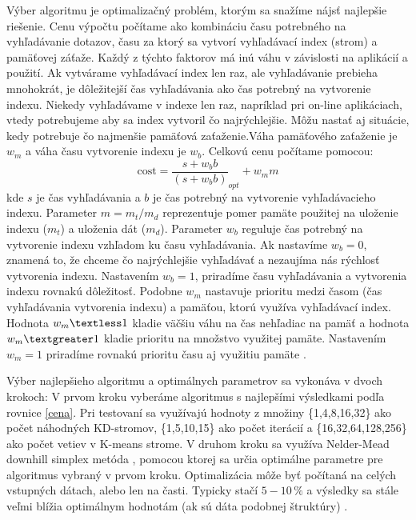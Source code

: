 \documentclass[12pt,a4paper,oneside]{fithesis2}
\begin{document}
	Výber algoritmu je optimalizačný problém, ktorým sa snažíme nájsť najlepšie riešenie. Cenu výpočtu počítame ako kombináciu času potrebného na vyhľadávanie dotazov, času za ktorý sa vytvorí vyhľadávací index (strom) a pamäťovej záťaže. Každý z týchto faktorov má inú váhu v závislosti na aplikácií a použití. Ak vytvárame vyhľadávací index len raz, ale vyhľadávanie prebieha mnohokrát, je dôležitejší čas vyhľadávania ako čas potrebný na vytvorenie indexu. Niekedy vyhľadávame v indexe len raz, napríklad pri on-line aplikáciach, vtedy potrebujeme aby sa index vytvoril čo najrýchlejšie. Môžu nastať aj situácie, kedy potrebuje čo najmenšie pamäťová zaťaženie.Váha pamäťového zaťaženie je $w_m$ a váha času vytvorenie indexu je $w_b$. Celkovú cenu počítame pomocou:
	\begin{equation}
	\mathrm{cost} = \dfrac{s + w_bb}{(s + w_bb)}_{opt} + w_mm
	\label{cena}
	\end{equation}
kde $s$ je čas vyhľadávania a $b$ je čas potrebný na vytvorenie vyhľadávacieho indexu. Parameter $m = m_t/m_d$ reprezentuje pomer pamäte použitej na uloženie indexu ($m_t$) a uloženia dát ($m_d$). Parameter $w_b$ reguluje čas potrebný na vytvorenie indexu vzhľadom ku času vyhľadávania. Ak nastavíme $w_b = 0$, znamená to, že chceme čo najrýchlejšie vyhľadávať a nezaujíma nás rýchlosť vytvorenia indexu. Nastavením $w_b = 1$, priradíme času vyhľadávania a vytvorenia indexu rovnakú dôležitosť. Podobne $w_m$ nastavuje prioritu medzi časom (čas vyhľadávania vytvorenia indexu) a pamäťou, ktorú využíva vyhľadávací index. Hodnota $w_m \textless 1$ kladie väčšiu váhu na čas nehľadiac na pamäť a hodnota $w_m \textgreater 1$  kladie prioritu na množstvo využitej pamäte. Nastavením $w_m = 1$ priradíme rovnakú prioritu času aj využitiu pamäte \cite{muja_flann_2009}. 

Výber najlepšieho algoritmu a optimálnych parametrov sa vykonáva v dvoch krokoch: V prvom kroku vyberáme algoritmus s najlepšími výsledkami podľa rovnice \ref{cena}. Pri testovaní sa využívajú hodnoty z množiny \{1,4,8,16,32\} ako počet náhodných KD-stromov, \{1,5,10,15\} ako počet iterácií a \{16,32,64,128,256\} ako počet vetiev v K-means strome. V druhom kroku sa využíva Nelder-Mead downhill simplex metóda \cite{NelderMead65}, pomocou ktorej sa určia optimálne parametre pre algoritmus vybraný v prvom kroku. Optimalizácia môže byť počítaná na celých vstupných dátach, alebo len na časti. Typicky stačí $5-10\,\%$ a výsledky sa stále veľmi blížia optimálnym hodnotám (ak sú dáta podobnej štruktúry) \cite{muja_flann_2009}.
\end{document}
